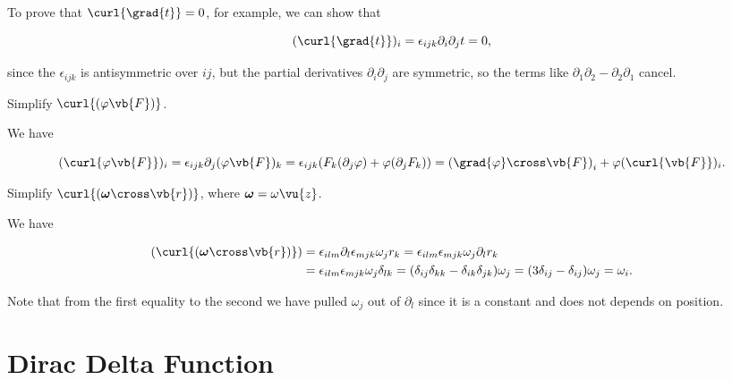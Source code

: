\documentclass[english,a4paper,12pt]{report}
\begin{document}
To prove that \(\curl{\grad{t} } = 0\), for example, we can show that 

\begin{equation}
	(\curl{\grad{t} })_{i}  = \epsilon _{ijk} \partial _{i}\partial _{j}t = 0,  
\end{equation}

since the \(\epsilon _{ijk} \) is antisymmetric over \(ij\), but the partial derivatives \(\partial _{i}\partial _{j}  \) are symmetric, so the terms like \(\partial _{1}\partial _{2} - \partial _{2}\partial _{1}    \)  cancel.   

{Simplify \(\curl{(\varphi \vb{F} )} \). }
{We have 

\begin{equation}
	(\curl{\varphi \vb{F} } )_{i} = \epsilon _{ijk}\partial _{j}(\varphi \vb{F} )_{k}  = \epsilon _{ijk}(F_{k} (\partial _{j}\varphi  ) + \varphi (\partial _{j}F_{k} )) = \left( \grad{\varphi } \cross \vb{F}   \right)_{i} + \varphi (\curl{\vb{F} })_{i}.   
\end{equation}

} 

{Simplify \(\curl{(\boldsymbol{\omega } \cross \vb{r}  )} \), where \(\boldsymbol{\omega } = \omega \vu{z} \).  }
{We have 

\begin{equation}
	\begin{aligned} 
	(\curl{(\boldsymbol{\omega }\cross \vb{r}  )} ) &= \epsilon _{ilm} \partial _{l} \epsilon _{mjk} \omega _{j} r_{k} = \epsilon _{ilm} \epsilon _{mjk} \omega _{j} \partial _{l} r_{k} \\
	&= \epsilon _{ilm} \epsilon _{mjk}  \omega _{j} \delta _{lk}  = (\delta _{ij} \delta _{kk} - \delta _{ik} \delta _{jk}   ) \omega _{j} = (3 \delta _{ij} - \delta _{ij}  ) \omega _{j} = \omega _{i}.
	\end{aligned}            
\end{equation}

Note that from the first equality to the second we have pulled \(\omega _{j} \) out of \(\partial _{l} \) since it is a constant and does not depends on position.  

} 



	
\section{Dirac Delta Function}
	
\end{document}
